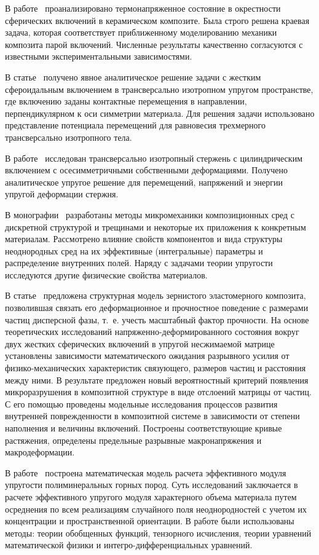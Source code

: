 В работе~\cite{Golovchan2000} проанализировано термонапряженное состояние в окрестности сферических включений в   керамическом композите. Была строго решена краевая задача, которая соответствует приближенному моделированию механики композита парой включений. Численные результаты качественно согласуются с известными экспериментальными зависимостями.

В статье~\cite{Zureick1988} получено явное аналитическое решение задачи с жестким сфероидальным включением в трансверсально изотропном упругом пространстве, где включению заданы контактные перемещения в направлении, перпендикулярном к оси симметрии материала. Для решения задачи использовано представление потенциала перемещений для равновесия трехмерного трансверсально изотропного тела.

В работе~\cite{Zhong} исследован трансверсально изотропный стержень с цилиндрическим включением с осесимметричными собственными деформациями. Получено аналитическое упругое решение для перемещений, напряжений и энергии упругой деформации стержня.

В монографии~\cite{Vanin1985} разработаны методы микромеханики композиционных сред с дискретной структурой и трещинами и некоторые их приложения к конкретным материалам. Рассмотрено влияние свойств компонентов и вида структуры неоднородных сред на их эффективные (интегральные) параметры и распределение внутренних полей. Наряду с задачами теории упругости исследуются другие физические свойства материалов.

В статье~\cite{Garishin} предложена структурная модель зернистого эластомерного композита, позволившая связать его деформационное и прочностное поведение с размерами частиц дисперсной фазы, т.~е. учесть масштабный фактор прочности. На основе теоретических исследований на\-пря\-жен\-но-де\-фор\-ми\-ро\-ван\-но\-го состояния вокруг двух жестких сферических включений в упругой несжимаемой матрице установлены зависимости математического ожидания разрывного усилия от физико-механических характеристик связующего, размеров частиц и расстояния между ними. В результате предложен новый вероятностный критерий появления микроразрушения в композитной структуре в виде отслоений матрицы от частиц. С его помощью проведены модельные исследования процессов развития внутренней поврежденности в композитной системе в зависимости от степени наполнения и величины включений. Построены соответствующие кривые растяжения, определены предельные разрывные макронапряжения и макродеформации.

В работе~\cite{Shailiev} построена математическая модель расчета эффективного модуля упругости полиминеральных горных пород. Суть исследований заключается в расчете эффективного упругого модуля характерного объема материала путем осреднения по всем реализациям случайного поля неоднородностей с учетом их концентрации и пространственной ориентации. В работе были использованы методы: теории обобщенных функций, тензорного исчисления, теории уравнений математической физики и ин\-тег\-ро-\-диф\-фе\-рен\-ци\-аль\-ных уравнений.

